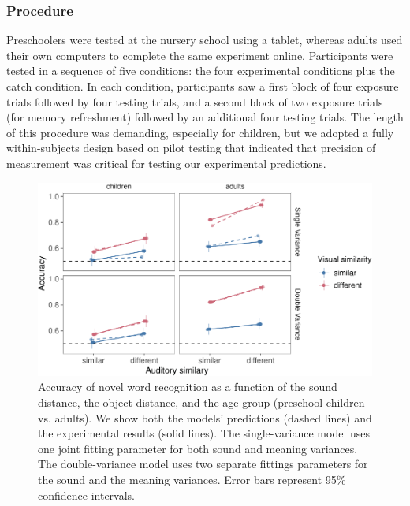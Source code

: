 \documentclass[10pt, letterpaper]{article}
\newenvironment{CodeChunk}{}{}
\begin{document}
\subsubsection{Procedure}\label{procedure}

Preschoolers were tested at the nursery school using a tablet, whereas
adults used their own computers to complete the same experiment online.
Participants were tested in a sequence of five conditions: the four
experimental conditions plus the catch condition. In each condition,
participants saw a first block of four exposure trials followed by four
testing trials, and a second block of two exposure trials (for memory
refreshment) followed by an additional four testing trials. The length
of this procedure was demanding, especially for children, but we adopted
a fully within-subjects design based on pilot testing that indicated
that precision of measurement was critical for testing our experimental
predictions.

\begin{CodeChunk}
\begin{figure}[h]

{\centering \includegraphics{figs/all_data-1} 

}

\caption{\label{fig:data_all}Accuracy of novel word recognition as a function of the sound distance, the object distance, and the age group (preschool children vs. adults). We show both the models' predictions (dashed lines) and the experimental results (solid lines). The single-variance model uses one joint fitting parameter for both sound and meaning variances. The double-variance model uses two separate fittings parameters for the sound and the meaning variances. Error bars represent 95\% confidence intervals.}\label{fig:all_data}
\end{figure}
\end{CodeChunk}
\end{document}
